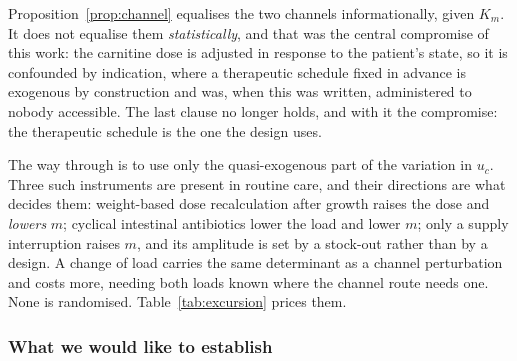 Proposition~\ref{prop:channel} equalises the two channels informationally, given $K_m$. It
does not equalise them \emph{statistically}, and that was the central compromise of this
work: the carnitine dose is adjusted in response to the patient's state, so it is confounded
by indication, where a therapeutic schedule fixed in advance is exogenous by construction
and was, when this was written, administered to nobody accessible. The last clause no longer
holds, and with it the compromise: the therapeutic schedule is the one the design uses.

The way through is to use only the quasi-exogenous part of the variation in $u_c$. Three
such instruments are present in routine care, and their directions are what decides them:
weight-based dose recalculation after growth raises the dose
and \emph{lowers} $m$; cyclical intestinal antibiotics lower the load and lower $m$; only a
supply interruption raises $m$, and its amplitude is set by a stock-out rather than by a
design. A change of load carries the same determinant as a channel perturbation and costs
more, needing both loads known where the channel route needs one. None is randomised.
Table~\ref{tab:excursion} prices them.

\subsubsection{What we would like to establish}
\label{sec:window}

